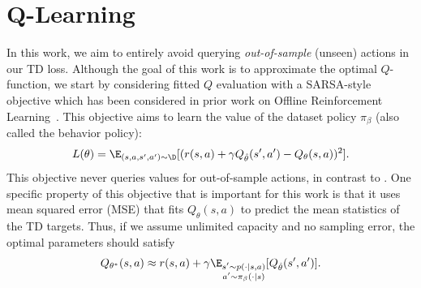 \vspace{-0.3cm}

\section{\Ournamepref Q-Learning}

In this work, we aim to entirely avoid querying \emph{out-of-sample} (unseen) actions in our TD loss.
Although the goal of this work is to approximate the optimal $Q$-function, we start by considering fitted $Q$ evaluation with a SARSA-style objective which has been considered in prior work on Offline Reinforcement Learning~\citep{brandfonbrener2021offline, gulcehre2021regularized}. This objective  aims to learn the value of the dataset policy $\pi_\beta$ (also called the behavior policy):
\begin{equation}
\label{eqn:td_sarsa}
L(\theta)=\E_{(s,a,s',a')\sim\D}[(r(s,a) + \gamma Q_{\hat{\theta}}(s', a') - Q_\theta(s,a))^2].
\end{equation}
This objective never queries values for out-of-sample actions, in contrast to . One specific property of this objective that is important for this work is that it uses mean squared error (MSE) that fits $Q_\theta(s,a)$ to predict the mean statistics of the TD targets. Thus, if we assume unlimited capacity and no sampling error, the optimal parameters should satisfy
\begin{equation}
    Q_{\theta^*}(s,a) \approx r(s,a) + \gamma \E_{\substack{s'\sim p(\cdot|s,a)\\a'\sim\pi_\beta(\cdot|s)}}[ Q_{\hat{\theta}}(s',a')].
\label{eqn:q_star}
\end{equation}
